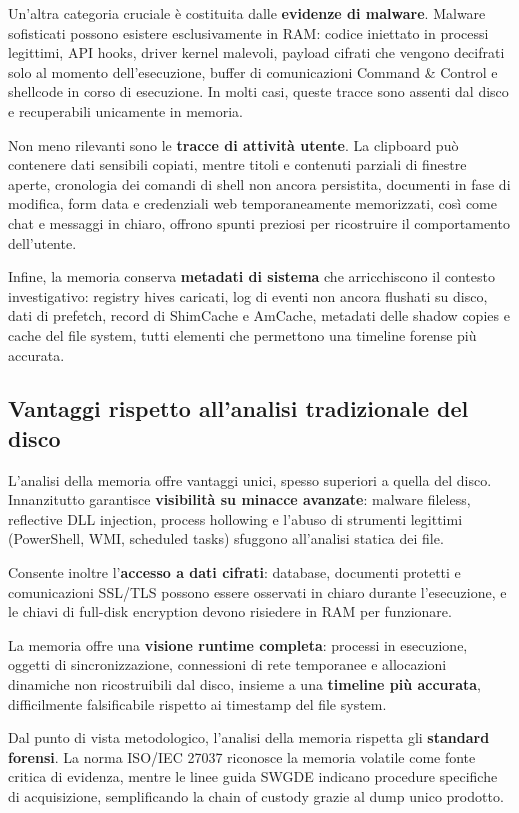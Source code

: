 Un’altra categoria cruciale è costituita dalle \textbf{evidenze di malware}. Malware sofisticati possono esistere esclusivamente in RAM: codice iniettato in processi legittimi, API hooks, driver kernel malevoli, payload cifrati che vengono decifrati solo al momento dell’esecuzione, buffer di comunicazioni Command \& Control e shellcode in corso di esecuzione. In molti casi, queste tracce sono assenti dal disco e recuperabili unicamente in memoria.

Non meno rilevanti sono le \textbf{tracce di attività utente}. La clipboard può contenere dati sensibili copiati, mentre titoli e contenuti parziali di finestre aperte, cronologia dei comandi di shell non ancora persistita, documenti in fase di modifica, form data e credenziali web temporaneamente memorizzati, così come chat e messaggi in chiaro, offrono spunti preziosi per ricostruire il comportamento dell’utente.

Infine, la memoria conserva \textbf{metadati di sistema} che arricchiscono il contesto investigativo: registry hives caricati, log di eventi non ancora flushati su disco, dati di prefetch, record di ShimCache e AmCache, metadati delle shadow copies e cache del file system, tutti elementi che permettono una timeline forense più accurata.

\subsection{Vantaggi rispetto all'analisi tradizionale del disco}

L’analisi della memoria offre vantaggi unici, spesso superiori a quella del disco. Innanzitutto garantisce \textbf{visibilità su minacce avanzate}: malware fileless, reflective DLL injection, process hollowing e l’abuso di strumenti legittimi (PowerShell, WMI, scheduled tasks) sfuggono all’analisi statica dei file.

Consente inoltre l’\textbf{accesso a dati cifrati}: database, documenti protetti e comunicazioni SSL/TLS possono essere osservati in chiaro durante l’esecuzione, e le chiavi di full-disk encryption devono risiedere in RAM per funzionare.

La memoria offre una \textbf{visione runtime completa}: processi in esecuzione, oggetti di sincronizzazione, connessioni di rete temporanee e allocazioni dinamiche non ricostruibili dal disco, insieme a una \textbf{timeline più accurata}, difficilmente falsificabile rispetto ai timestamp del file system.

Dal punto di vista metodologico, l’analisi della memoria rispetta gli \textbf{standard forensi}. La norma ISO/IEC 27037 \cite{iso27037} riconosce la memoria volatile come fonte critica di evidenza, mentre le linee guida SWGDE \cite{swgde2022} indicano procedure specifiche di acquisizione, semplificando la chain of custody grazie al dump unico prodotto.


